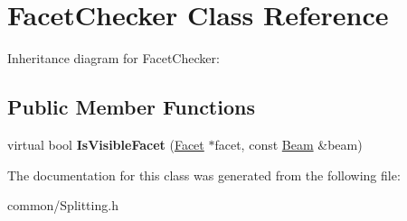 \hypertarget{class_facet_checker}{}\section{Facet\+Checker Class Reference}
\label{class_facet_checker}


Inheritance diagram for Facet\+Checker\+:
\subsection*{Public Member Functions}
\begin{DoxyCompactItemize}
\item 
\mbox{\label{class_facet_checker_a8a9a9cf11307ed986ed8ea16825ee40b}} 
virtual bool {\bfseries Is\+Visible\+Facet} (\mbox{\hyperlink{class_facet}{Facet}} $\ast$facet, const \mbox{\hyperlink{class_beam}{Beam}} \&beam)
\end{DoxyCompactItemize}


The documentation for this class was generated from the following file\+:\begin{DoxyCompactItemize}
\item 
common/Splitting.\+h\end{DoxyCompactItemize}
